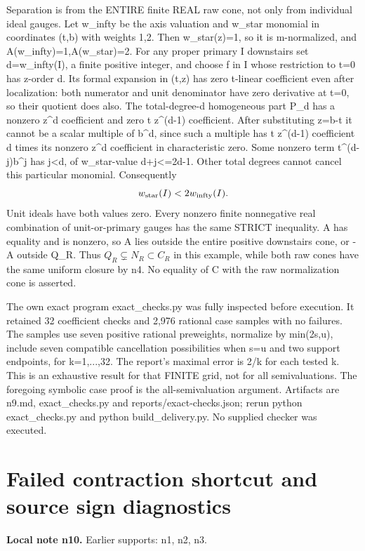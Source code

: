 \documentclass[11pt]{article}
\begin{document}
Separation is from the ENTIRE finite REAL raw cone, not only from individual ideal gauges. Let w\_infty be the axis valuation and w\_star monomial in coordinates (t,b) with weights 1,2. Then w\_star(z)=1, so it is m-normalized, and A(w\_infty)=1,A(w\_star)=2. For any proper primary I downstairs set d=w\_infty(I), a finite positive integer, and choose f in I whose restriction to t=0 has z-order d. Its formal expansion in (t,z) has zero t-linear coefficient even after localization: both numerator and unit denominator have zero derivative at t=0, so their quotient does also. The total-degree-d homogeneous part P\_d has a nonzero z\textasciicircum{}d coefficient and zero t z\textasciicircum{}(d-1) coefficient. After substituting z=b-t it cannot be a scalar multiple of b\textasciicircum{}d, since such a multiple has t z\textasciicircum{}(d-1) coefficient d times its nonzero z\textasciicircum{}d coefficient in characteristic zero. Some nonzero term t\textasciicircum{}(d-j)b\textasciicircum{}j has j<d, of w\_star-value d+j<=2d-1. Other total degrees cannot cancel this particular monomial. Consequently
\[
 w_{\rm star}(I)<2w_{\rm infty}(I).
\]
Unit ideals have both values zero. Every nonzero finite nonnegative real combination of unit-or-primary gauges has the same STRICT inequality. A has equality and is nonzero, so A lies outside the entire positive downstairs cone, or -A outside Q\_R. Thus \(Q_R\subsetneq N_R\subset C_R\) in this example, while both raw cones have the same uniform closure by n4. No equality of C with the raw normalization cone is asserted.

The own exact program exact\_checks.py was fully inspected before execution. It retained 32 coefficient checks and 2,976 rational case samples with no failures. The samples use seven positive rational preweights, normalize by min(2s,u), include seven compatible cancellation possibilities when s=u and two support endpoints, for k=1,...,32. The report's maximal error is 2/k for each tested k. This is an exhaustive result for that FINITE grid, not for all semivaluations. The foregoing symbolic case proof is the all-semivaluation argument. Artifacts are n9.md, exact\_checks.py and reports/exact-checks.json; rerun python exact\_checks.py and python build\_delivery.py. No supplied checker was executed.


\section{Failed contraction shortcut and source sign diagnostics}
\label{sec:n10}
\noindent\textbf{Local note n10.} Earlier supports: n1, n2, n3.
\end{document}
